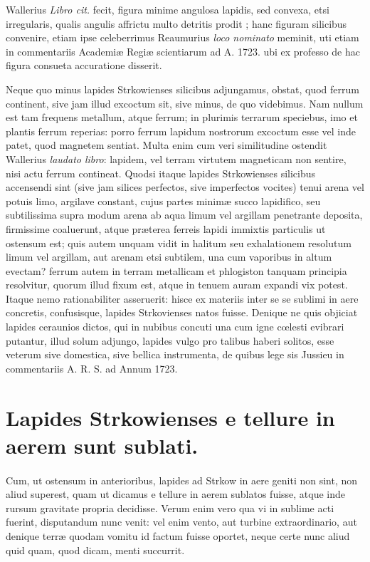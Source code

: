 \documentclass[a4paper, 11pt, oneside, polutonikogreek, latin]{article}
\begin{document}
Wallerius \emph{Libro cit.} fecit, figura minime angulosa lapidis, sed convexa, etsi irregularis, qualis angulis affrictu multo detritis prodit ; hanc figuram silicibus convenire, etiam ipse celeberrimus Reaumurius \emph{loco nominato} meminit, uti etiam in commentariis Academiæ Regiæ scientiarum ad A. 1723. ubi ex professo de hac figura consueta accuratione disserit.

Neque quo minus lapides Strkowienses silicibus adjungamus, obstat, quod ferrum continent, sive jam illud excoctum sit, sive minus, de quo videbimus. Nam nullum est tam frequens metallum, atque ferrum; in plurimis terrarum speciebus, imo et plantis ferrum reperias: porro ferrum lapidum nostrorum excoctum esse vel inde patet, quod magnetem sentiat.  Multa enim cum veri similitudine ostendit Wallerius \emph{laudato libro}: lapidem, vel terram virtutem magneticam non sentire, nisi actu ferrum contineat. Quodsi itaque lapides Strkowienses silicibus accensendi sint (sive jam silices perfectos, sive imperfectos vocites) tenui arena vel potuis limo, argilave constant, cujus partes minimæ succo lapidifico, seu subtilissima supra modum arena ab aqua limum vel argillam penetrante deposita, firmissime coaluerunt, atque præterea ferreis lapidi immixtis particulis ut ostensum est; quis autem unquam vidit in halitum seu exhalationem resolutum limum vel argillam, aut arenam etsi subtilem, una cum vaporibus in altum evectam? ferrum autem in terram metallicam et phlogiston tanquam principia resolvitur, quorum illud fixum est, atque in tenuem auram expandi vix potest. Itaque nemo rationabiliter asseruerit: hisce ex materiis inter se se sublimi in aere concretis, confusisque, lapides Strkovienses natos fuisse. Denique ne quis objiciat lapides ceraunios dictos, qui in nubibus concuti una cum igne cœlesti evibrari putantur, illud solum adjungo, lapides vulgo pro talibus haberi solitos, esse veterum sive domestica, sive bellica instrumenta, de quibus lege sis Jussieu in commentariis A. R. S. ad Annum 1723.
\clearpage
\section{Lapides Strkowienses e tellure in aerem sunt sublati.}
\paragraph{}
Cum, ut ostensum in anterioribus, lapides ad Strkow in aere geniti non sint, non aliud superest, quam ut dicamus e tellure in aerem sublatos fuisse, atque inde rursum gravitate propria decidisse. Verum enim vero qua vi in sublime acti fuerint, disputandum nunc venit: vel enim vento, aut turbine extraordinario, aut denique terræ quodam vomitu id factum fuisse oportet, neque certe nunc aliud quid quam, quod dicam, menti succurrit.
\clearpage
\end{document}
